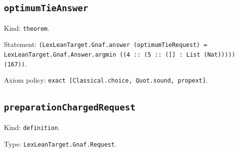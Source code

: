 \documentclass[11pt]{article}
\begin{document}
\subsection*{\texttt{optimumTieAnswer}}
\noindent Kind: \texttt{theorem}.\par
\noindent Statement: \texttt{(LexLeanTarget.Gnaf.answer (optimumTieRequest) = LexLeanTarget.Gnaf.Answer.argmin ((4 :: (5 :: ([] : List (Nat))))) (167))}.\par
\noindent Axiom policy: \texttt{exact [Classical.choice, Quot.sound, propext]}.\par
\subsection*{\texttt{preparationChargedRequest}}
\noindent Kind: \texttt{definition}.\par
\noindent Type: \texttt{LexLeanTarget.Gnaf.Request}.\par
\end{document}
